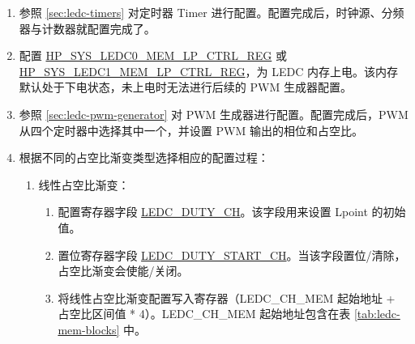 \documentclass[main\_\_CN.tex]{subfiles}
\begin{document}
\begin{enumerate}
\begin{enumerate}
    \item  将 \hyperref[fielddesc:HPSYSCLKRSTLEDC0CLKEN]{HP\_SYS\_CLKRST\_LEDC0\_CLK\_EN} 字段置 1 使能 LEDC0\_CLK；或者将 \hyperref[fielddesc:HPSYSCLKRSTLEDC1CLKEN]{HP\_SYS\_CLKRST\_LEDC1\_CLK\_EN} 字段置 1 使能 LEDC1\_CLK。
    \end{enumerate}
    \item 参照 \ref{sec:ledc-timers} 对定时器 Timer 进行配置。配置完成后，时钟源、分频器与计数器就配置完成了。
    \item 配置 \hyperref[regdesc:HPSYSLEDC0MEMLPCTRLREG]{HP\_SYS\_LEDC0\_MEM\_LP\_CTRL\_REG} 或 \hyperref[regdesc:HPSYSLEDC1MEMLPCTRLREG]{HP\_SYS\_LEDC1\_MEM\_LP\_CTRL\_REG}，为 LEDC 内存上电。该内存默认处于下电状态，未上电时无法进行后续的 PWM 生成器配置。
    \item 参照 \ref{sec:ledc-pwm-generator} 对 PWM 生成器进行配置。配置完成后，PWM 从四个定时器中选择其中一个，并设置 PWM 输出的相位和占空比。
    \item 根据不同的占空比渐变类型选择相应的配置过程：
    \begin{enumerate}
    \item 线性占空比渐变：
    \begin{enumerate}
    \item 配置寄存器字段 \hyperref[fielddesc:LEDCDUTYCHN]{LEDC\_DUTY\_CH}。该字段用来设置 Lpoint 的初始值。
    \item 置位寄存器字段 \hyperref[fielddesc:LEDCDUTYSTARTCHN]{LEDC\_DUTY\_START\_CH}。当该字段置位/清除，占空比渐变会使能/关闭。
    \item 将线性占空比渐变配置写入寄存器（LEDC\_CH\_MEM 起始地址 + 占空比区间值 * 4）。LEDC\_CH\_MEM 起始地址包含在表 \ref{tab:ledc-mem-blocks} 中。


\end{enumerate}
\end{enumerate}
\end{enumerate}
\end{document}
